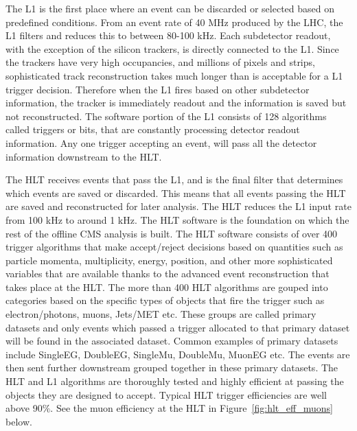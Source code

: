 The L1 is the first place where an event can be discarded or selected based on predefined conditions. From an event rate of 40 MHz produced by the LHC, the L1 filters and reduces this to between 80-100 kHz.  
Each subdetector readout, with the exception of the silicon trackers, is directly connected to the L1. Since the trackers have very high occupancies, and millions
of pixels and strips, sophisticated track reconstruction takes much longer than is acceptable for a L1 trigger decision. Therefore when the L1 fires based on other subdetector information, the tracker is immediately readout and the information is saved
but not reconstructed. The software portion of the L1 consists of 128 algorithms called triggers or bits, that are constantly processing detector readout information. Any one trigger accepting an event, will pass all the detector information downstream
to the HLT. 

The HLT receives events that pass the L1, and is the final filter that determines which events are saved or discarded. This means that all events passing the HLT are saved and reconstructed for later analysis.
The HLT reduces the L1 input rate from 100 kHz to around 1 kHz. The HLT software is the foundation on which the rest of the offline CMS analysis is built. The HLT software consists of over 400 trigger algorithms that make accept/reject decisions
based on quantities such as particle momenta, multiplicity, energy, position, and other more sophisticated variables that are available thanks to the advanced event reconstruction that takes place at the HLT.
The more than 400 HLT algorithms are gouped into categories based on the specific types of objects that fire the trigger such as electron/photons, muons, Jets/MET etc. These groups are called primary datasets and only events which passed a trigger
allocated to that primary dataset will be found in the associated dataset. Common examples of primary datasets include SingleEG, DoubleEG, SingleMu, DoubleMu, MuonEG etc. The events are then sent further downstream grouped together in these primary datasets.
The HLT and L1 algorithms are thoroughly tested and highly efficient at passing the objects they are
designed to accept. Typical HLT trigger efficiencies are well above 90$\%$. See the muon efficiency at the HLT in Figure~\ref{fig:hlt_eff_muons} below. 

